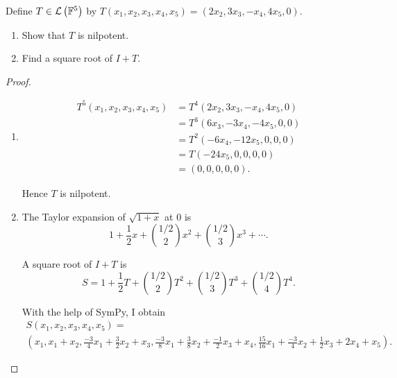 \begin{exercise}\label{chapter8:sectionC:exercise2}
    Define $T\in\mathcal{L}\left({\mathbb{F}^{5}}\right)$ by $T(x_{1}, x_{2}, x_{3}, x_{4}, x_{5}) = (2x_{2}, 3x_{3}, -x_{4}, 4x_{5}, 0)$.
    \begin{enumerate}[label={(\alph*)}]
        \item Show that $T$ is nilpotent.
        \item Find a square root of $I + T$.
    \end{enumerate}
\end{exercise}

\begin{proof}
    \begin{enumerate}[label={(\alph*)}]
        \item \begin{align*}
                  T^{5}(x_{1}, x_{2}, x_{3}, x_{4}, x_{5}) & = T^{4}(2x_{2}, 3x_{3}, -x_{4}, 4x_{5}, 0) \\
                                                           & = T^{3}(6x_{3}, -3x_{4}, -4x_{5}, 0, 0)    \\
                                                           & = T^{2}(-6x_{4}, -12x_{5}, 0, 0, 0)        \\
                                                           & = T(-24x_{5}, 0, 0, 0, 0)                  \\
                                                           & = (0, 0, 0, 0, 0).
              \end{align*}

              Hence $T$ is nilpotent.
        \item The Taylor expansion of $\sqrt{1 + x}$ at $0$ is
              \[
                  1 + \frac{1}{2}x + \binom{1/2}{2}x^{2} + \binom{1/2}{3}x^{3} + \cdots.
              \]

              A square root of $I + T$ is
              \[
                  S = 1 + \frac{1}{2}T + \binom{1/2}{2}T^{2} + \binom{1/2}{3}T^{3} + \binom{1/2}{4}T^{4}.
              \]

              With the help of SymPy, I obtain
              \begin{multline*}
                  S(x_{1}, x_{2}, x_{3}, x_{4}, x_{5}) = \\
                  \left(x_{1}, x_{1} + x_{2}, \frac{-3}{4}x_{1} + \frac{3}{2}x_{2} + x_{3}, \frac{-3}{8}x_{1} + \frac{3}{8}x_{2} + \frac{-1}{2}x_{3} + x_{4}, \frac{15}{16}x_{1} + \frac{-3}{4}x_{2} + \frac{1}{2}x_{3} + 2x_{4} + x_{5}\right).
              \end{multline*}
    \end{enumerate}
\end{proof}
\newpage

